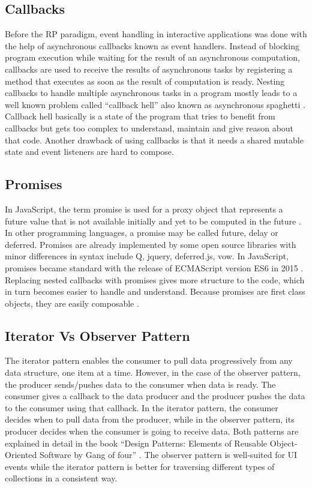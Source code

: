 \subsection{Callbacks}
Before the RP paradigm, event handling in interactive applications was done with the help of asynchronous callbacks known as event handlers. 
Instead of blocking program execution while waiting for the result of an asynchronous computation, callbacks are used to receive the results of asynchronous tasks by registering a method that executes as soon as the result of computation is ready. Nesting callbacks to handle multiple asynchronous tasks in a program mostly leads to a well known problem called ``callback hell'' \cite{Kambona:2013:ERP:2489798.2489802} also known as asynchronous spaghetti \cite{SMLI-TR-2007-166}. Callback hell basically is a state of the program that tries to benefit from callbacks but gets too complex to understand, maintain and give reason about that code. Another drawback of using callbacks is that it needs a shared mutable state and event listeners are hard to compose.

\subsection{Promises}
In JavaScript, the term promise is used for a proxy object that represents a future value that is not available initially and yet to be computed in the future \cite{Kambona:2013:ERP:2489798.2489802}.  In other programming languages, a promise may be called future, delay or deferred. Promises are already implemented by some open source libraries with minor differences in syntax include Q, jquery, deferred.js, vow. In JavaScript, promises became standard with the release of ECMAScript version ES6 in 2015 \cite{ecmaScriptPromise}.
Replacing nested callbacks with promises gives more structure to the code, which in turn becomes easier to handle and understand. Because promises are first class objects, they are easily composable \cite{Kambona:2013:ERP:2489798.2489802}.

\subsection{Iterator Vs Observer Pattern}
The iterator pattern enables the consumer to pull data progressively from any data structure, one item at a time. However, in the case of the observer pattern, the producer sends/pushes data to the consumer when data is ready. The consumer gives a callback to the data producer and the producer pushes the data to the consumer using that callback. In the iterator pattern, the consumer decides when to pull data from the producer, while in the observer pattern, its producer decides when the consumer is going to receive data. Both patterns are explained in detail in the book ``Design Patterns: Elements of Reusable Object-Oriented Software by Gang of four'' \cite{Gamma:1995:DPE:186897}. The observer pattern is well-suited for UI events while the iterator pattern is better for traversing different types of collections in a consistent way.


